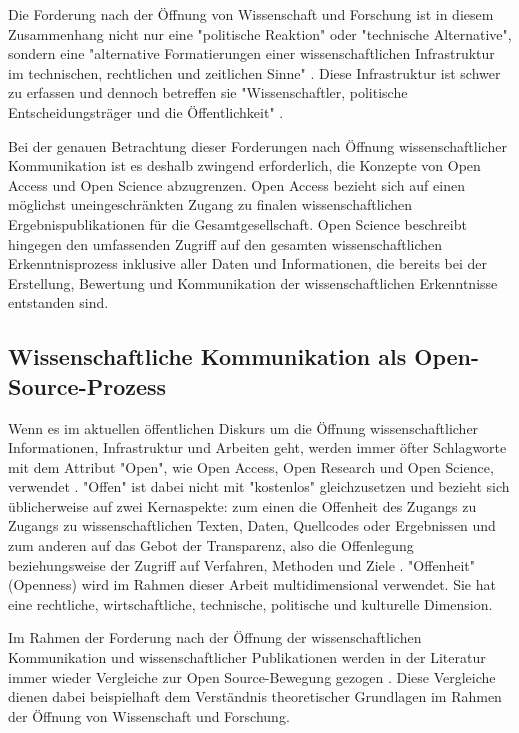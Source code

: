Die Forderung nach der Öffnung von Wissenschaft und Forschung ist in diesem Zusammenhang nicht nur eine "politische Reaktion" oder "technische Alternative", sondern eine "alternative Formatierungen einer wissenschaftlichen Infrastruktur im technischen, rechtlichen und zeitlichen Sinne" \cite{kelty_2004}. Diese Infrastruktur ist schwer zu erfassen \cite[:319]{bowker_2000_sorting} und dennoch betreffen sie "Wissenschaftler, politische Entscheidungsträger und die Öffentlichkeit" \cite{Scheliga_2014}.

Bei der genauen Betrachtung dieser Forderungen nach Öffnung wissenschaftlicher Kommunikation ist es deshalb zwingend erforderlich, die Konzepte von Open Access und Open Science abzugrenzen. Open Access bezieht sich auf einen möglichst uneingeschränkten Zugang zu finalen wissenschaftlichen Ergebnispublikationen für die Gesamtgesellschaft. Open Science beschreibt hingegen den umfassenden Zugriff auf den gesamten wissenschaftlichen Erkenntnisprozess inklusive aller Daten und Informationen, die bereits bei der Erstellung, Bewertung und Kommunikation der wissenschaftlichen Erkenntnisse entstanden sind.

\subsection{Wissenschaftliche Kommunikation als Open-Source-Prozess}

Wenn es im aktuellen öffentlichen Diskurs um die Öffnung wissenschaftlicher Informationen, Infrastruktur und Arbeiten geht, werden immer öfter Schlagworte mit dem Attribut "Open", wie Open Access, Open Research und Open Science, verwendet \cite{bunz_2014} \cite{schulze_2013_open}. "Offen" ist dabei nicht mit "kostenlos" gleichzusetzen \cite{grand_2012_open} und bezieht sich üblicherweise auf zwei Kernaspekte: zum einen die Offenheit des Zugangs zu Zugangs zu wissenschaftlichen Texten, Daten, Quellcodes oder Ergebnissen und zum anderen auf das Gebot der Transparenz, also die Offenlegung beziehungsweise der Zugriff auf Verfahren, Methoden und Ziele \cite{schulze_2013_open}. "Offenheit" (Openness) wird im Rahmen dieser Arbeit multidimensional verwendet. Sie hat eine rechtliche, wirtschaftliche, technische, politische und kulturelle Dimension.

Im Rahmen der Forderung nach der Öffnung der wissenschaftlichen Kommunikation und wissenschaftlicher Publikationen werden in der Literatur immer wieder Vergleiche zur Open Source-Bewegung gezogen  \cite{cite:9} \cite{Peters_2014} \cite{RIN_2010_open_research} \cite[:423]{mantz_2007_open} \cite{cite:1}. Diese Vergleiche dienen dabei beispielhaft dem Verständnis theoretischer Grundlagen im Rahmen der Öffnung von Wissenschaft und Forschung.

